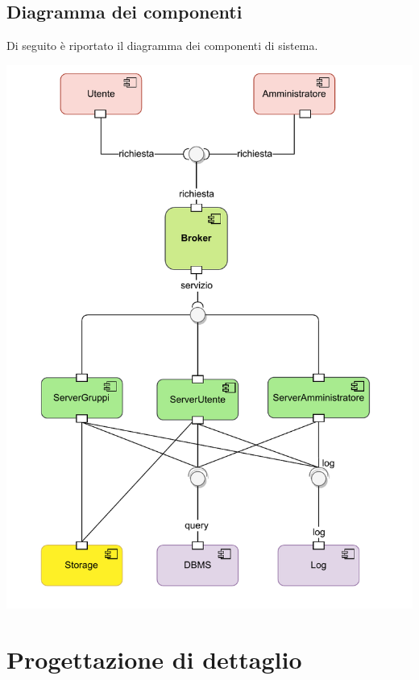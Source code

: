 \pagebreak
{}
\subsection*{Diagramma dei componenti}
Di seguito è riportato il diagramma dei componenti di sistema.
\vspace{2cm}
\begin{adjustwidth}{0.5cm}{0cm}
\includegraphics[scale=0.9]{progettazione/Progettazione-Diagramma Componenti.drawio.pdf}
\end{adjustwidth}
\vspace{1cm}


\pagebreak
{}
\section*{Progettazione di dettaglio}
\vspace{1cm}

